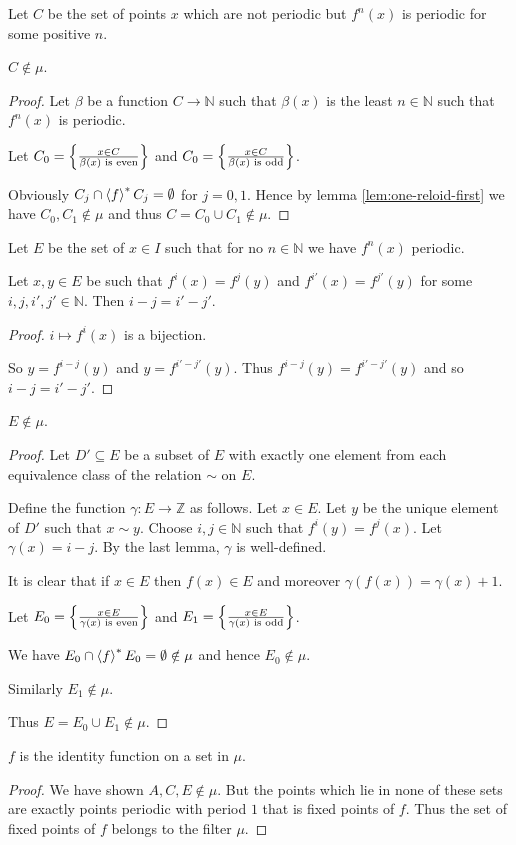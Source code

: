 Let $C$ be the set of points $x$ which are not periodic but $f^{n}(x)$
is periodic for some positive $n$.
\begin{lem}
$C\notin\mu$.\end{lem}
\begin{proof}
Let $\beta$ be a function $C\rightarrow\mathbb{N}$ such that $\beta(x)$
is the least $n\in\mathbb{N}$ such that $f^{n}(x)$ is periodic.

Let $C_{0}=\left\{ \frac{x\in C}{\beta(x)\text{ is even}}\right\}$ and $C_{0}=\left\{ \frac{x\in C}{\beta(x)\text{ is odd}}\right\}$.

Obviously $C_{j}\cap\left\langle f\right\rangle ^{\ast}C_{j}=\emptyset$ for $j=0,1$. Hence
by lemma \ref{lem:one-reloid-first} we have $C_{0},C_{1}\notin\mu$
and thus $C=C_{0}\cup C_{1}\notin\mu$.
\end{proof}
Let $E$ be the set of $x\in I$ such that for no $n\in\mathbb{N}$
we have $f^{n}(x)$ periodic.
\begin{lem}
Let $x,y\in E$ be such that $f^{i}(x)=f^{j}(y)$ and $f^{i'}(x)=f^{j'}(y)$
for some $i,j,i',j'\in\mathbb{N}$. Then $i-j=i'-j'$.\end{lem}
\begin{proof}
$i\mapsto f^{i}(x)$ is a bijection.

So $y=f^{i-j}(y)$ and $y=f^{i'-j'}(y)$. Thus $f^{i-j}(y)=f^{i'-j'}(y)$
and so $i-j=i'-j'$.\end{proof}
\begin{lem}
$E\notin\mu$.\end{lem}
\begin{proof}
Let $D'\subseteq E$ be a subset of $E$ with exactly one element
from each equivalence class of the relation $\sim$ on $E$.

Define the function $\gamma:E\rightarrow\mathbb{Z}$ as follows. Let
$x\in E$. Let $y$ be the unique element of $D'$ such that $x\sim y$.
Choose $i,j\in\mathbb{N}$ such that $f^{i}(y)=f^{j}(x)$. Let $\gamma(x)=i-j$.
By the last lemma, $\gamma$ is well-defined.

It is clear that if $x\in E$ then $f(x)\in E$ and moreover $\gamma(f(x))=\gamma(x)+1$.

Let $E_{0}=\left\{ \frac{x\in E}{\gamma(x)\text{ is even}}\right\}$ and $E_{1}=\left\{ \frac{x\in E}{\gamma(x)\text{ is odd}}\right\}$.

We have $E_{0}\cap\left\langle f\right\rangle ^{\ast}E_{0}=\emptyset\notin\mu$ and hence $E_{0}\notin\mu$.

Similarly $E_{1}\notin\mu$.

Thus $E=E_{0}\cup E_{1}\notin\mu$.\end{proof}
\begin{lem}
$f$ is the identity function on a set in $\mu$.\end{lem}
\begin{proof}
We have shown $A,C,E\notin\mu$. But the points which lie in none
of these sets are exactly points periodic with period $1$ that is
fixed points of $f$. Thus the set of fixed points of $f$ belongs
to the filter $\mu$.
\end{proof}

